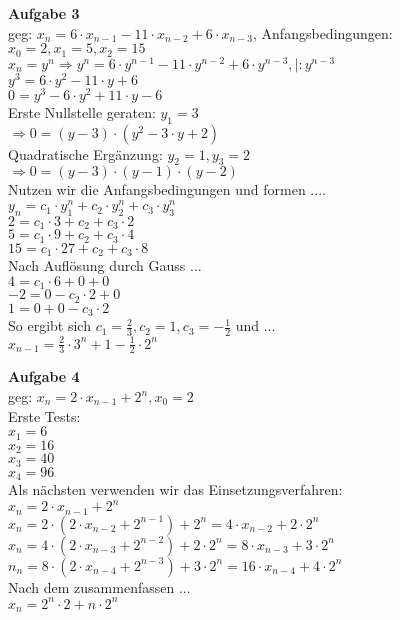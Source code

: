 \documentclass[a4paper]{scrartcl}
\begin{document}
	\begin{flushleft}
		\textbf{Aufgabe 3}\\
		geg: $x_n=6\cdot x_{n-1}-11\cdot x_{n-2}+ 6\cdot x_{n-3}$, Anfangsbedingungen: $x_0=2, x_1=5, x_2=15$\\[1em]
		$x_n=y^n \Rightarrow y^n=6\cdot y^{n-1}-11\cdot y^{n-2}+6\cdot y^{n-3}, |:y^{n-3}$\\
		$y^3=6\cdot y^2-11\cdot y+6$\\
		$0 = y^3-6\cdot y^2+11\cdot y-6$\\
		Erste Nullstelle geraten: $y_1=3$\\
		$\Rightarrow 0=(y-3)\cdot(y^2-3\cdot y+2)$\\
		Quadratische Ergänzung: $y_2=1, y_3=2$\\
		$\Rightarrow 0=(y-3)\cdot(y-1)\cdot(y-2)$\\
		Nutzen wir die Anfangsbedingungen und formen ....\\
		$y_n=c_1\cdot y_1^n+c_2\cdot y_2^n+c_3\cdot y_3^n$\\
		$2=c_1\cdot 3+c_2+c_3\cdot 2$\\
		$5=c_1\cdot 9+c_2+c_3\cdot 4$\\
		$15=c_1\cdot 27+c_2+c_3\cdot 8$\\
		Nach Auflösung durch Gauss ...\\
		$4=c_1\cdot 6+0+0$\\
		$-2=0-c_2\cdot 2+0$\\
		$1=0+0-c_3\cdot 2$\\
		So ergibt sich $c_1=\frac{2}{3}, c_2=1, c_3=-\frac{1}{2}$ und ...\\
		$x_{n-1}=\frac{2}{3}\cdot 3^n+1-\frac{1}{2}\cdot 2^n$\\
	\end{flushleft}
	\begin{flushleft}
		\textbf{Aufgabe 4}\\
		geg: $x_n=2\cdot x_{n-1}+2^n, x_0=2$\\
		Erste Tests:\\
		$x_1=6$\\		
		$x_2=16$\\
		$x_3=40$\\
		$x_4=96$\\
		Als nächsten verwenden wir das Einsetzungsverfahren:\\
		$x_n=2\cdot x_{n-1}+2^n$\\
		$x_n=2\cdot (2\cdot x_{n-2}+2^{n-1})+2^n=4\cdot x_{n-2}+2\cdot 2^n$\\
		$x_n=4\cdot (2\cdot x_{n-3}+2^{n-2})+2\cdot 2^n=8\cdot x_{n-3}+3\cdot 2^n$\\
		$n_n=8\cdot (2\cdot x_{n-4}+2^{n-3})+3\cdot 2^n=16\cdot x_{n-4}+4\cdot 2^n$\\
		Nach dem zusammenfassen ...\\
		$x_n=2^n\cdot 2+n\cdot 2^n$\\
	\end{flushleft}
\end{document}
